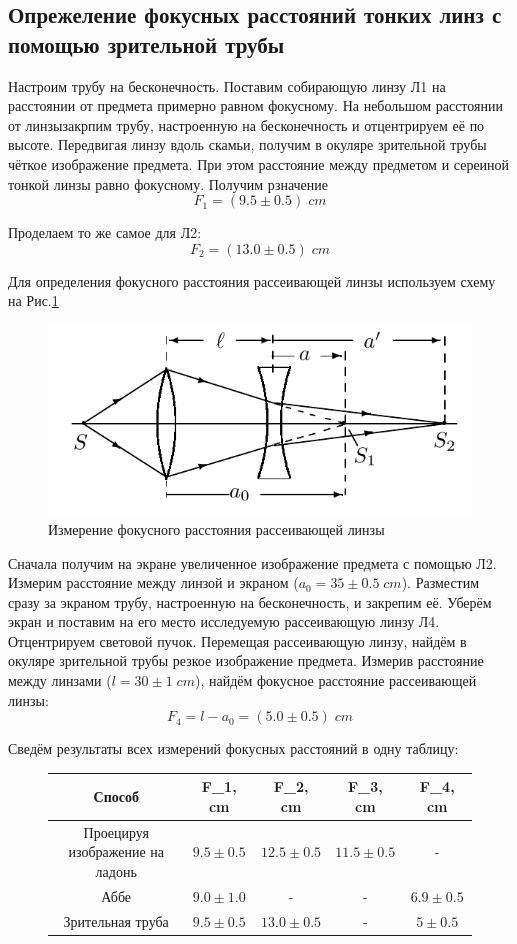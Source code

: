 \documentclass{article}
\begin{document}
\subsection{Опрежеление фокусных расстояний тонких линз с помощью зрительной трубы}
Настроим трубу на бесконечность. Поставим собирающую линзу Л1 на расстоянии от предмета примерно равном
фокусному. На небольшом расстоянии от линзызакрпим трубу, настроенную на бесконечность и
отцентрируем её по высоте. Передвигая линзу вдоль скамьи, получим в окуляре зрительной трубы чёткое
изображение предмета. При этом расстояние между предметом и сереиной тонкой линзы равно фокусному.
Получим рзначение
\[ F_1 = (9.5\pm 0.5)\; cm\]

Проделаем то же самое для Л2:
\[ F_2 = (13.0\pm 0.5)\; cm\]

Для определения фокусного расстояния рассеивающей линзы используем схему на Рис.\ref{fig:dispel}
\begin{figure}[H]
  \centering
  \includegraphics[width = \textwidth]{dispel.png}
  \caption{Измерение фокусного расстояния рассеивающей линзы}\label{fig:dispel}
\end{figure}

Сначала получим на экране увеличенное изображение предмета с помощью Л2. Измерим расстояние
между линзой и экраном (\(a_0 = 35\pm 0.5\; cm\)). Разместим сразу за экраном трубу,
настроенную на бесконечность, и закрепим её. Уберём экран и поставим на его место исследуемую
рассеивающую линзу Л4. Отцентрируем световой пучок. Перемещая рассеивающую линзу, найдём в 
окуляре зрительной трубы резкое изображение предмета. Измерив расстояние между линзами
(\(l = 30 \pm 1\; cm\)), найдём фокусное расстояние рассеивающей линзы:
\[ F_4 = l - a_0 = (5.0 \pm 0.5)\; cm \]

Сведём результаты всех измерений фокусных расстояний в одну таблицу:
\begin{figure}[H]
  \centering
  \begin{tabular}{|c|c|c|c|c|}
    \hline
    Способ & F_1, cm & F_2, cm & F_3, cm & F_4, cm \\\hline
    Проецируя изображение на ладонь   & \(9.5 \pm 0.5\) & \(12.5 \pm 0.5\) & \(11.5\pm 0.5\) & - \\\hline
    Аббе     & \(9.0 \pm 1.0\) & - & - &\(6.9 \pm 0.5\) \\\hline
    Зрительная труба & \(9.5 \pm 0.5\) & \(13.0 \pm 0.5\) & - &\(5 \pm 0.5\) \\\hline
  \end{tabular}
\end{figure}
\end{document}

